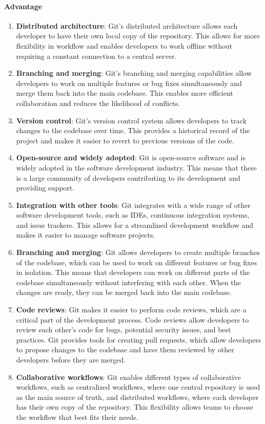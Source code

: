\documentclass[10pt, a4paper]{article}
\begin{document}
\paragraph*{Advantage}
\begin{enumerate}
    \item \textbf{Distributed architecture}: 
    Git's distributed architecture allows each developer to have their own local copy of the repository. This allows for more flexibility in workflow and enables developers to work offline without requiring a constant connection to a central server.
    \item \textbf{Branching and merging}:
    Git's branching and merging capabilities allow developers to work on multiple features or bug fixes simultaneously and merge them back into the main codebase. This enables more efficient collaboration and reduces the likelihood of conflicts.
    \item \textbf{Version control}:
    Git's version control system allows developers to track changes to the codebase over time. This provides a historical record of the project and makes it easier to revert to previous versions of the code.
    \item \textbf{Open-source and widely adopted}:
    Git is open-source software and is widely adopted in the software development industry. This means that there is a large community of developers contributing to its development and providing support.
    \item \textbf{Integration with other tools}:
    Git integrates with a wide range of other software development tools, such as IDEs, continuous integration systems, and issue trackers. This allows for a streamlined development workflow and makes it easier to manage software projects.
    \item \textbf{Branching and merging}:
    Git allows developers to create multiple branches of the codebase, which can be used to work on different features or bug fixes in isolation. This means that developers can work on different parts of the codebase simultaneously without interfering with each other. When the changes are ready, they can be merged back into the main codebase.
    \item \textbf{Code reviews}:
    Git makes it easier to perform code reviews, which are a critical part of the development process. Code reviews allow developers to review each other's code for bugs, potential security issues, and best practices. Git provides tools for creating pull requests, which allow developers to propose changes to the codebase and have them reviewed by other developers before they are merged.
    \item \textbf{Collaborative workflows}:
    Git enables different types of collaborative workflows, such as centralized workflows, where one central repository is used as the main source of truth, and distributed workflows, where each developer has their own copy of the repository. This flexibility allows teams to choose the workflow that best fits their needs.
\end{enumerate}
\end{document}
